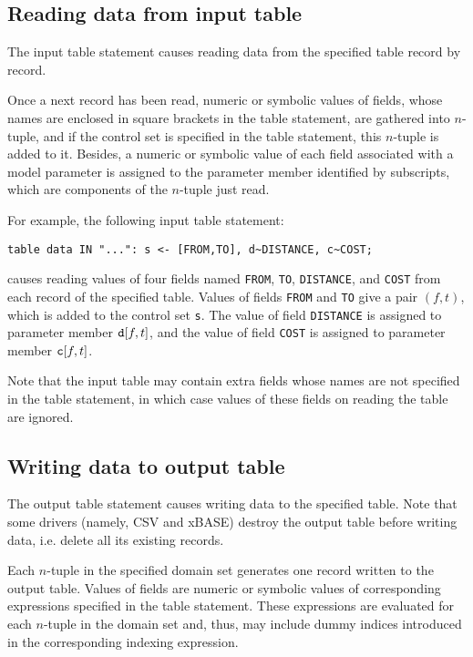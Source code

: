 \documentclass[11pt,draft]{article}
\begin{document}
\subsection*{Reading data from input table}

The input table statement causes reading data from the specified table
record by record.

Once a next record has been read, numeric or symbolic values of fields,
whose names are enclosed in square brackets in the table statement, are
gathered into $n$-tuple, and if the control set is specified in the
table statement, this $n$-tuple is added to it. Besides, a numeric or
symbolic value of each field associated with a model parameter is
assigned to the parameter member identified by subscripts, which are
components of the $n$-tuple just read.

For example, the following input table statement:

\begin{verbatim}
table data IN "...": s <- [FROM,TO], d~DISTANCE, c~COST;
\end{verbatim}

\noindent
causes reading values of four fields named {\tt FROM}, {\tt TO},
{\tt DISTANCE}, and {\tt COST} from each record of the specified table.
Values of fields {\tt FROM} and {\tt TO} give a pair $(f,t)$, which is
added to the control set {\tt s}. The value of field {\tt DISTANCE} is
assigned to parameter member ${\tt d}[f,t]$, and the value of field
{\tt COST} is assigned to parameter member ${\tt c}[f,t]$.

Note that the input table may contain extra fields whose names are not
specified in the table statement, in which case values of these fields
on reading the table are ignored.

\subsection*{Writing data to output table}

The output table statement causes writing data to the specified table.
Note that some drivers (namely, CSV and xBASE) destroy the output table
before writing data, i.e. delete all its existing records.

Each $n$-tuple in the specified domain set generates one record written
to the output table. Values of fields are numeric or symbolic values of
corresponding expressions specified in the table statement. These
expressions are evaluated for each $n$-tuple in the domain set and,
thus, may include dummy indices introduced in the corresponding indexing
expression.
\end{document}
